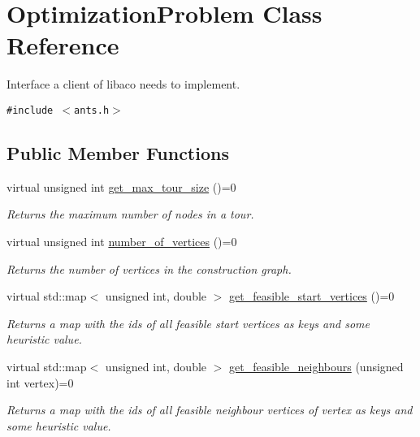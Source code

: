 \hypertarget{classOptimizationProblem}{
\section{OptimizationProblem Class Reference}
\label{classOptimizationProblem}
}
Interface a client of libaco needs to implement.  


{\tt \#include $<$ants.h$>$}

\subsection*{Public Member Functions}
\begin{CompactItemize}
\item 
virtual unsigned int \hyperlink{classOptimizationProblem_c415a4d1350cd3580f2fcf26f7f6196c}{get\_\-max\_\-tour\_\-size} ()=0
\begin{CompactList}\small\item\em Returns the maximum number of nodes in a tour. \item\end{CompactList}\item 
virtual unsigned int \hyperlink{classOptimizationProblem_3f2b6672193e9b543f9a3419b6a516e8}{number\_\-of\_\-vertices} ()=0
\begin{CompactList}\small\item\em Returns the number of vertices in the construction graph. \item\end{CompactList}\item 
virtual std::map$<$ unsigned int, double $>$ \hyperlink{classOptimizationProblem_9d90c97f690e8987a152b37d0c51e744}{get\_\-feasible\_\-start\_\-vertices} ()=0
\begin{CompactList}\small\item\em Returns a map with the ids of all feasible start vertices as keys and some heuristic value. \item\end{CompactList}\item 
virtual std::map$<$ unsigned int, double $>$ \hyperlink{classOptimizationProblem_582a4ef61a491e2741060c2f83c3fc2e}{get\_\-feasible\_\-neighbours} (unsigned int vertex)=0
\begin{CompactList}\small\item\em Returns a map with the ids of all feasible neighbour vertices of vertex as keys and some heuristic value. \item\end{CompactList}\item 

\end{CompactItemize}
